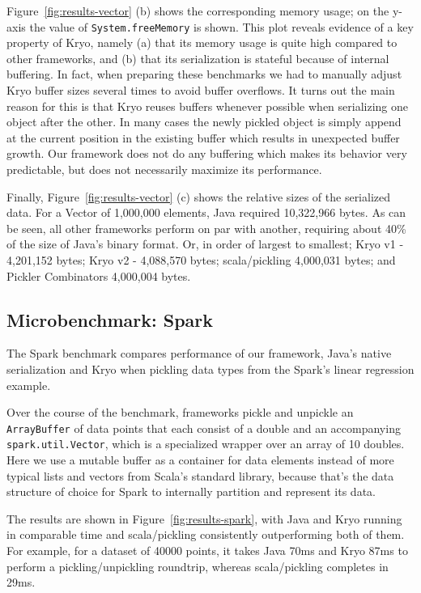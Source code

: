 \documentclass[preprint,10pt]{sigplanconf}
\theoremstyle{definition}
\theoremstyle{definition}
\begin{document}
Figure~\ref{fig:results-vector} (b) shows the corresponding memory usage; on the
y-axis the value of \texttt{System.freeMemory} is shown. This plot
reveals evidence of a key property of Kryo, namely (a) that its memory usage
is quite high compared to other frameworks, and (b) that its
serialization is stateful because of internal buffering. In fact, when
preparing these benchmarks we had to manually adjust Kryo buffer sizes
several times to avoid buffer overflows. It turns out the main reason
for this is that Kryo reuses buffers whenever possible when
serializing one object after the other. In many cases the
newly pickled object is simply append at the current position in the
existing buffer which results in unexpected buffer growth. Our
framework does not do any buffering which makes its behavior very
predictable, but does not necessarily maximize its performance.

Finally, Figure~\ref{fig:results-vector} (c) shows the relative sizes of the serialized data. For a Vector of 1,000,000 elements, Java required 10,322,966 bytes. As can be seen, all other frameworks perform on par with another, requiring about 40\% of the size of Java's binary format. Or, in order of largest to smallest; Kryo v1 - 4,201,152 bytes; Kryo v2 - 4,088,570 bytes; scala/pickling 4,000,031 bytes; and Pickler Combinators 4,000,004 bytes.

\subsection{Microbenchmark: Spark}

The Spark benchmark compares performance of our framework, Java's native
serialization and Kryo when pickling data types from the Spark's linear
regression example.

Over the course of the benchmark, frameworks pickle and unpickle an
\verb|ArrayBuffer| of data points that each consist of a double
and an accompanying \verb|spark.util.Vector|, which
is a specialized wrapper over an array of 10 doubles. Here we use a
mutable buffer as a container for data elements instead
of more typical lists and vectors from Scala's standard library,
because that's the data structure of choice for Spark
to internally partition and represent its data.

The results are shown in Figure~\ref{fig:results-spark}, with Java and Kryo
running in comparable time and scala/pickling consistently outperforming both of them. For example, for a dataset of 40000 points, it takes Java 70ms and Kryo 87ms to perform a pickling/unpickling roundtrip, whereas scala/pickling completes in 29ms.
\end{document}
